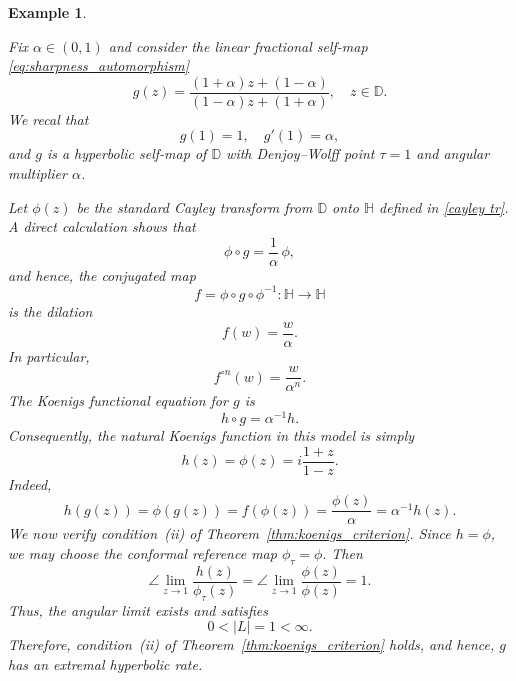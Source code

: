 \documentclass[10pt,a4paper]{amsart}
\numberwithin{equation}{section}
\newtheorem{example}[equation]{Example}
\begin{document}
\begin{example}
\label{ex:lft_koenigs}

Fix $\alpha\in(0,1)$ and consider the linear fractional self-map \eqref{eq:sharpness_automorphism}
\begin{equation*}
g(z)
=
\frac{(1+\alpha)z+(1-\alpha)}
     {(1-\alpha)z+(1+\alpha)},
\quad z\in\mathbb{D}.
\end{equation*}
We recal that
\begin{equation*}
g(1)=1,
\quad
g'(1)=\alpha,
\end{equation*}
and $g$ is a hyperbolic self-map of $\mathbb{D}$ with Denjoy--Wolff
point $\tau=1$ and angular multiplier $\alpha$.

Let $\phi(z)$
be the standard Cayley transform from $\mathbb{D}$ onto $\mathbb{H}$ defined in \eqref{cayley tr}.
A direct calculation shows that
\begin{equation*}
\phi\circ g=\frac1\alpha\,\phi,
\end{equation*}
and hence, the conjugated map
\begin{equation*}
f=\phi\circ g\circ\phi^{-1}:\mathbb{H}\to\mathbb{H}
\end{equation*}
is the dilation
\begin{equation*}
f(w)=\frac{w}{\alpha}.
\end{equation*}
In particular,
\begin{equation*}
f^{\circ n}(w)=\frac{w}{\alpha^n}.
\end{equation*}
The Koenigs functional equation for $g$ is
\begin{equation*}
h\circ g=\alpha^{-1}h.
\end{equation*}
Consequently, the natural Koenigs function in this model is simply
\begin{equation*}
h(z)=\phi(z)=i\frac{1+z}{1-z}.
\end{equation*}
Indeed,
\begin{equation*}
h(g(z))
=
\phi(g(z))
=
f(\phi(z))
=
\frac{\phi(z)}{\alpha}
=
\alpha^{-1}h(z).
\end{equation*}
We now verify condition~\emph{(ii)} of
Theorem~\ref{thm:koenigs_criterion}. Since $h=\phi$, we may choose
the conformal reference map $\phi_\tau=\phi.$ Then
\begin{equation*}
\angle\lim_{z\to1}
\frac{h(z)}{\phi_\tau(z)}
=
\angle\lim_{z\to1}
\frac{\phi(z)}{\phi(z)}
=
1.
\end{equation*}
Thus, the angular limit exists and satisfies
\begin{equation*}
0<|L|=1<\infty.
\end{equation*}
Therefore, condition~\emph{(ii)} of
Theorem~\ref{thm:koenigs_criterion} holds, and hence, $g$ has an
extremal hyperbolic rate.


\end{example}
\end{document}
